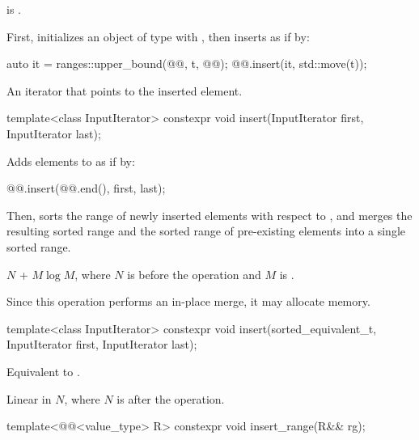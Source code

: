 \begin{itemdescr}
\pnum
\constraints
{} is .

\pnum
\effects
First, initializes an object  of type 
with ,
then inserts  as if by:
\begin{codeblock}
auto it = ranges::upper_bound(@@, t, @@);
@@.insert(it, std::move(t));
\end{codeblock}

\pnum
\returns
An iterator that points to the inserted element.
\end{itemdescr}

%
\begin{itemdecl}
template<class InputIterator>
  constexpr void insert(InputIterator first, InputIterator last);
\end{itemdecl}

\begin{itemdescr}
\pnum
\effects
Adds elements to  as if by:
\begin{codeblock}
@@.insert(@@.end(), first, last);
\end{codeblock}
Then, sorts the range of newly inserted elements with respect to ,
and merges the resulting sorted range and
the sorted range of pre-existing elements into a single sorted range.

\pnum
\complexity
$N$ + $M \log M$, where $N$ is  before the operation and $M$
is .

\pnum
\remarks
Since this operation performs an in-place merge, it may allocate memory.
\end{itemdescr}

%
\begin{itemdecl}
template<class InputIterator>
  constexpr void insert(sorted_equivalent_t, InputIterator first, InputIterator last);
\end{itemdecl}

\begin{itemdescr}
\pnum
\effects
Equivalent to .

\pnum
\complexity
Linear in $N$, where $N$ is  after the operation.
\end{itemdescr}

%
\begin{itemdecl}
template<@@<value_type> R>
  constexpr void insert_range(R&& rg);
\end{itemdecl}

